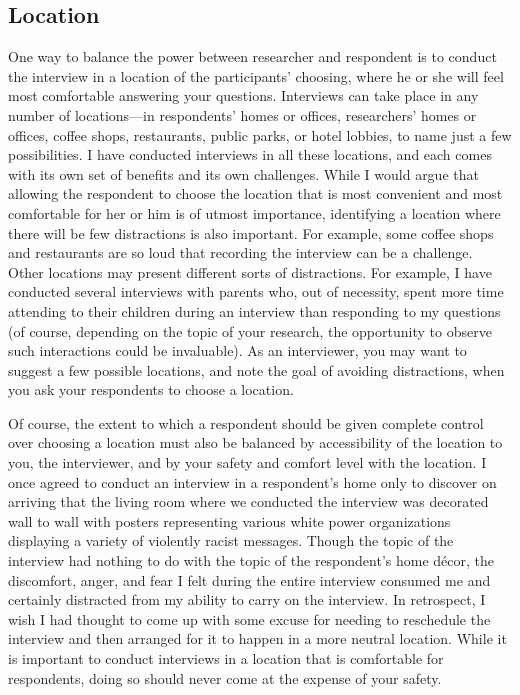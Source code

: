 \subsection{Location}

One way to balance the power between researcher and respondent is to conduct the interview in a location of the participants’ choosing, where he or she will feel most comfortable answering your questions. Interviews can take place in any number of locations—in respondents’ homes or offices, researchers’ homes or offices, coffee shops, restaurants, public parks, or hotel lobbies, to name just a few possibilities. I have conducted interviews in all these locations, and each comes with its own set of benefits and its own challenges. While I would argue that allowing the respondent to choose the location that is most convenient and most comfortable for her or him is of utmost importance, identifying a location where there will be few distractions is also important. For example, some coffee shops and restaurants are so loud that recording the interview can be a challenge. Other locations may present different sorts of distractions. For example, I have conducted several interviews with parents who, out of necessity, spent more time attending to their children during an interview than responding to my questions (of course, depending on the topic of your research, the opportunity to observe such interactions could be invaluable). As an interviewer, you may want to suggest a few possible locations, and note the goal of avoiding distractions, when you ask your respondents to choose a location.

Of course, the extent to which a respondent should be given complete control over choosing a location must also be balanced by accessibility of the location to you, the interviewer, and by your safety and comfort level with the location. I once agreed to conduct an interview in a respondent’s home only to discover on arriving that the living room where we conducted the interview was decorated wall to wall with posters representing various white power organizations displaying a variety of violently racist messages. Though the topic of the interview had nothing to do with the topic of the respondent’s home décor, the discomfort, anger, and fear I felt during the entire interview consumed me and certainly distracted from my ability to carry on the interview. In retrospect, I wish I had thought to come up with some excuse for needing to reschedule the interview and then arranged for it to happen in a more neutral location. While it is important to conduct interviews in a location that is comfortable for respondents, doing so should never come at the expense of your safety.

